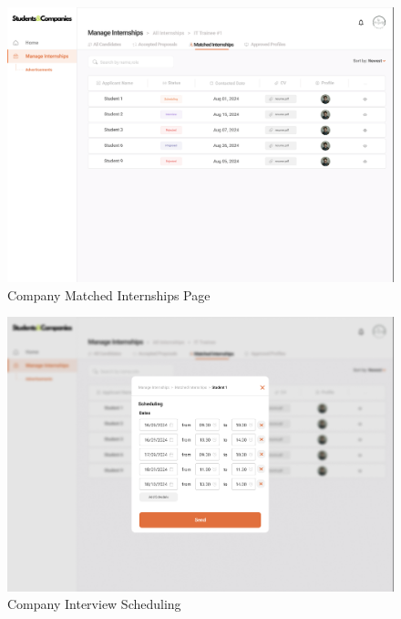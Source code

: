 \documentclass[a4paper,12pt]{article}
\begin{document}
\begin{figure}[H]
    \centering
    \includegraphics[scale = 0.42]{figures/UserInterfaces/Company/MatchedCompany.png}
    \caption{Company Matched Internships Page}
     \centering
\end{figure}
\begin{figure}[H]
    \centering
    \includegraphics[scale = 0.42]{figures/UserInterfaces/Company/Scheduling.png}
    \caption{Company Interview Scheduling}
     \centering
\end{figure}
\end{document}
